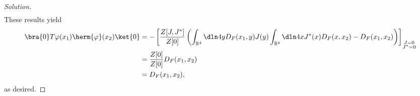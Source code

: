 \begin{proof}[Solution]
\begin{align*}
    \end{align*}
    These results yield
    \begin{align*}
        \bra{0}T \varphi(x_1) \herm{\varphi}(x_2) \ket{0} &= - \left[\frac{Z[J, J^*]}{Z[0]} \left(\int_{\mathbb{R}^4} \dln4y D_F(x_1,y) J(y) \int_{\mathbb{R}^4} \dln4x J^*(x) D_F(x, x_2) - D_F(x_1, x_2)\right)\right]_{\substack{J = 0\\J^*=0}}\\
                                                          &= \frac{Z[0]}{Z[0]} D_F(x_1, x_2)\\
                                                          &= D_F(x_1,x_2),
    \end{align*}
    as desired.
\end{proof}
